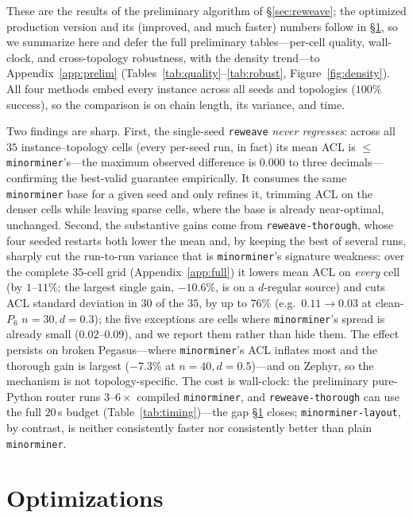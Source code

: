 \documentclass[acmsmall,anonymous,nonacm]{acmart}
\begin{document}
These are the results of the preliminary algorithm of \S\ref{sec:reweave}; the
optimized production version and its (improved, and much faster) numbers follow in
\S\ref{sec:optimizations}, so we summarize here and defer the full preliminary
tables---per-cell quality, wall-clock, and cross-topology robustness, with the
density trend---to Appendix~\ref{app:prelim}
(Tables~\ref{tab:quality}--\ref{tab:robust}, Figure~\ref{fig:density}). All four
methods embed every instance across all seeds and topologies ($100\%$ success), so
the comparison is on chain length, its variance, and time.

Two findings are sharp. First, the single-seed \texttt{reweave} \emph{never
regresses}: across all $35$ instance--topology cells (every per-seed run, in
fact) its mean ACL is $\le$ \texttt{minorminer}'s---the maximum observed
difference is $0.000$ to three decimals---confirming the best-valid guarantee
empirically. It consumes the same \texttt{minorminer} base for a given seed and
only refines it, trimming ACL on the denser cells while leaving sparse cells,
where the base is already near-optimal, unchanged. Second, the substantive gains
come from \texttt{reweave-thorough}, whose four seeded restarts both lower the
mean and, by keeping the best of several runs, sharply cut the run-to-run variance
that is \texttt{minorminer}'s signature weakness: over the complete $35$-cell grid
(Appendix~\ref{app:full}) it lowers mean ACL on \emph{every} cell (by $1$--$11\%$;
the largest single gain, $-10.6\%$, is on a $d$-regular source) and cuts ACL
standard deviation in $30$ of the $35$, by up to $76\%$ (e.g.\
$0.11\!\to\!0.03$ at clean-$P_6$ $n{=}30,d{=}0.3$); the five exceptions are cells
where \texttt{minorminer}'s spread is already small ($0.02$--$0.09$), and we
report them rather than hide them. The effect persists on broken Pegasus---where
\texttt{minorminer}'s ACL inflates most and the thorough gain is largest
($-7.3\%$ at $n{=}40,d{=}0.5$)---and on Zephyr, so the mechanism is not
topology-specific. The cost is wall-clock: the preliminary pure-Python router runs
$3$--$6\times$ compiled \texttt{minorminer}, and \texttt{reweave-thorough} can use
the full $20$\,s budget (Table~\ref{tab:timing})---the gap
\S\ref{sec:optimizations} closes; \texttt{minorminer-layout}, by contrast, is
neither consistently faster nor consistently better than plain
\texttt{minorminer}.

\section{Optimizations}
\label{sec:optimizations}
\end{document}
